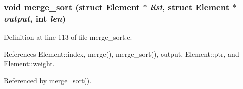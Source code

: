 \subsubsection{\setlength{\rightskip}{0pt plus 5cm}void merge\_\-sort (struct \bf{Element} $\ast$ {\em list}, struct \bf{Element} $\ast$ {\em output}, int {\em len})}\label{merge__sort_8h_0ac3ede4817614f686f82d83538cd730}




Definition at line 113 of file merge\_\-sort.c.

References Element::index, merge(), merge\_\-sort(), output, Element::ptr, and Element::weight.

Referenced by merge\_\-sort().